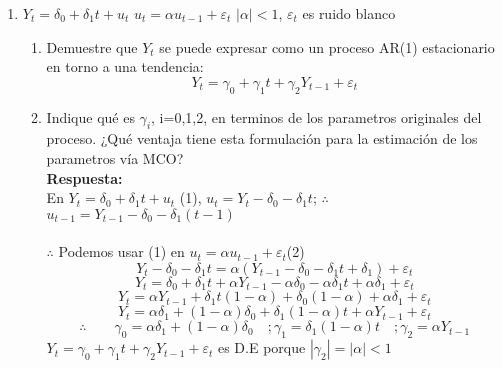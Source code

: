 \documentclass[12pt,letterpaper]{article}
\begin{document}
\begin{enumerate}
\item $Y_{t}=\delta_{0}+\delta_{1}t+u_{t}$ \hspace{4mm}  $u_{t}=\alpha u_{t-1}+\varepsilon_{t}$ \hspace{4mm} $|\alpha|<1$,  $\varepsilon_{t}$ es ruido blanco
    \begin{enumerate}
      \item Demuestre que $Y_{t}$ se puede expresar como un proceso AR(1) estacionario en torno a una tendencia:
    \begin{equation*}
        Y_{t}=\gamma_{0}+\gamma_{1}t+\gamma_{2}Y_{t-1}+\varepsilon_{t}
    \end{equation*}
    \item Indique qué es $\gamma_{i}$, i=0,1,2, en terminos de los parametros originales del proceso. ¿Qué ventaja tiene esta formulación para la estimación de los parametros vía MCO?
    \\
    \textbf{Respuesta:}
    \\
    En $Y_{t}=\delta_{0}+\delta_{1}t+u_{t}$ (1), $u_{t}=Y_{t}-\delta_{0}-\delta_{1}t$; $\therefore$ $u_{t-1}=Y_{t-1}-\delta_{0}-\delta_{1}(t-1)$
    \\
    \\
    $\therefore$ Podemos usar (1) en $u_{t}=\alpha u_{t-1}+\varepsilon_{t}$(2)
    \begin{equation*}
        Y_{t}-\delta_{0}-\delta_{1}t=\alpha(Y_{t-1}-\delta_{0}-\delta_{1}t+\delta_{1})+\varepsilon_{t}
    \end{equation*}
    \begin{equation*}
        Y_{t}=\delta_{0}+\delta_{1}t+\alpha Y_{t-1} -\alpha \delta_{0}-\alpha \delta_{1}t+\alpha \delta_{1}+\varepsilon_{t}
    \end{equation*}
    \begin{equation*}
        Y_{t}=\alpha Y_{t-1}+\delta_{1}t(1-\alpha)+\delta_{0}(1-\alpha)+\alpha\delta_{1}+\varepsilon_{t}
    \end{equation*}
    \begin{equation*}
         Y_{t}=\alpha \delta_{1}+(1-\alpha)\delta_{0}+\delta_{1}(1-\alpha)t+\alpha Y_{t-1}+\varepsilon_{t}
    \end{equation*}
    \begin{equation*}
        \therefore \quad \quad \gamma_{0}=\alpha \delta_{1}+(1-\alpha)\delta_{0}\quad ;\gamma_{1}=\delta_{1}(1-\alpha)t\quad ; \gamma_{2}=\alpha Y_{t-1}
    \end{equation*}
    $Y_{t}=\gamma_{0}+\gamma_{1}t+\gamma_{2}Y_{t-1}+\varepsilon_{t}$ es D.E porque $|\gamma_{2}|=|\alpha|<1$

\end{enumerate}
\end{enumerate}
\end{document}
